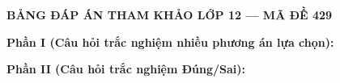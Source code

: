 
\newpage
\begin{center} \textbf{BẢNG ĐÁP ÁN THAM KHẢO LỚP 12 --- MÃ ĐỀ 429} \end{center}

\noindent \textbf{Phần I (Câu hỏi trắc nghiệm nhiều phương án lựa chọn):}  

\noindent \textbf{Phần II (Câu hỏi trắc nghiệm Đúng/Sai):}

\label{B\thedeso}

